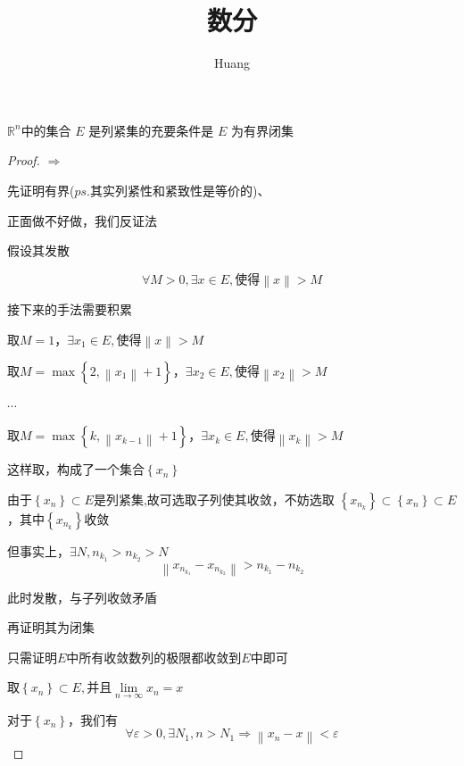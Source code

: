 \documentclass[lang=cn,10pt]{elegantbook}
\title{数分}
\author{ Huang}
\begin{document}
	
	\maketitle
	\frontmatter
	
	\mainmatter
	\begin{theorem}
		$\mathbb{R} ^n$中的集合 $E$
		是列紧集的充要条件是 $E$ 为有界闭集
	\end{theorem}
	\begin{proof}
		
		$\Rightarrow$
		
		先证明有界($ps.$其实列紧性和紧致性是等价的)、
		
		正面做不好做，我们反证法
		
		假设其发散
		
		\begin{equation*}
			\forall M>0,\exists x\in E,\text{使得}\left\| x \right\| >M
		\end{equation*}
		
		接下来的手法需要积累
		
		取$M=1$，$\exists x_{1}\in E,\text{使得}\left\| x \right\| >M$
		
		取$M=\max \left\{ 2,\left\| x_1 \right\| +1 \right\} $，$\exists x_{2}\in E,\text{使得}\left\| x_{2} \right\| >M$
		
		$\cdots$
		
		取$M=\max \left\{ k,\left\| x_{k-1} \right\| +1 \right\} $，$\exists x_{k}\in E,\text{使得}\left\| x_{k} \right\| >M$
		
		这样取，构成了一个集合$\left\{ x_n \right\} 
		$
		
		由于$\left\{ x_n \right\} 
		\subset E$是列紧集,故可选取子列使其收敛，不妨选取
		$\left\{ x_{n_{k}} \right\} 
		\subset\left\{ x_n \right\} 
		\subset E$，其中$\left\{ x_{n_{k}} \right\} $收敛
		
		但事实上，$\exists N,n_{k_{1}}> n_{k_{2}}>N$
		\begin{equation*}
			\left\| x_{n_{k_1}}-x_{n_{k_2}} \right\| >n_{k_1}-n_{k_2}
		\end{equation*}
		
		此时发散，与子列收敛矛盾
		
		再证明其为闭集
		
		只需证明$E$中所有收敛数列的极限都收敛到$E$中即可
		
		$\text{取}\left\{ x_n \right\} \subset E,\text{并且}\underset{n\rightarrow \infty}{\lim}x_n=x$
		
		对于$\left\{ x_n \right\}$，我们有
		\begin{equation*}
			\forall \varepsilon>0 ,\exists N_{1},n>N_{1}\Rightarrow \left\| x_n-x \right\| <\varepsilon
		\end{equation*}
		

\end{proof}
\end{document}
